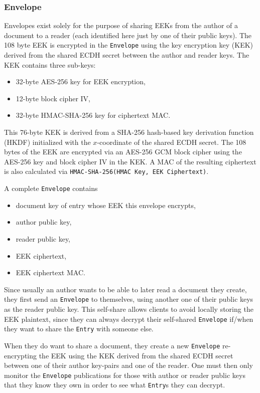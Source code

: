 \documentclass[10pt]{article}
\newcommand{\ttt}[1]{\texttt{#1}}
\def\Entry{\ttt{Entry}}
\def\Envelope{\ttt{Envelope}}
\begin{document}
\subsubsection{Envelope}
Envelopes exist solely for the purpose of sharing EEKs from the author of a document to a reader (each identified here just by one of their public keys). The 108 byte EEK is encrypted in the \Envelope{} using the key encryption key (KEK) derived from the shared ECDH secret between the author and reader keys. The KEK contains three sub-keys:
\begin{itemize}
	\item 32-byte AES-256 key for EEK encryption,
	\item 12-byte block cipher IV,
	\item 32-byte HMAC-SHA-256 key for ciphertext MAC.
\end{itemize}
This 76-byte KEK is derived from a SHA-256 hash-based key derivation function (HKDF) initialized with the $x$-coordinate of the shared ECDH secret. The 108 bytes of the EEK are encrypted via an AES-256 GCM block cipher using the AES-256 key and block cipher IV in the KEK. A MAC of the resulting ciphertext is also calculated via \ttt{HMAC-SHA-256(HMAC Key, EEK Ciphertext)}.

A complete \Envelope{} contains
\begin{itemize}
	\item document key of entry whose EEK this envelope encrypts,
	\item author public key,
	\item reader public key,
	\item EEK ciphertext,
	\item EEK ciphertext MAC.
\end{itemize}
Since usually an author wants to be able to later read a document they create, they first send an \Envelope{} to themselves, using another one of their public keys as the reader public key. This self-share allows clients to avoid locally storing the EEK plaintext, since they can always decrypt their self-shared \Envelope{} if/when they want to share the \Entry{} with someone else.

When they do want to share a document, they create a new \Envelope{} re-encrypting the EEK using the KEK derived from the shared ECDH secret between one of their author key-pairs and one of the reader. One must then only monitor the \Envelope{} publications for those with author or reader public keys that they know they own in order to see what \Entry{}s they can decrypt.
\end{document}
